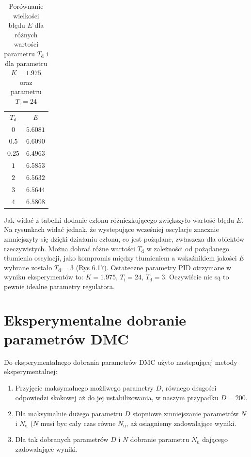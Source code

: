 \begin{table}
	[b] \caption{Porównanie wielkości błędu $E$ dla różnych wartości parametru $T_{\mathrm{d}}$ i dla parametru $K=1.975$ oraz parametru $T_{\mathrm{i}}=24$}
	\label{t_T_i}
	\centering
	\begin{small}
		\begin{tabular}{|c|c|}
			\hline
			$T_{\mathrm{d}}$	&	$E$	\\
			$0$		&	$\num{5.6081}$		\\
			$\num{0.5}$ 	&	$\num{6.6090}$		\\
			$\num{0.25}	$ & $\num{6.4963}$ \\
			$1$ 	&	$\num{6.5853}$		\\
			$2$		&	$\num{6.5632}$	\\
			$3$		&	$\num{6.5644}$	\\
			$4$		&	$\num{6.5808}$	\\
			\hline
			\end{tabular}
	\end{small}
\end{table}

Jak widać z tabelki dodanie członu różniczkującego zwiększyło wartość błędu $E$. Na rysunkach widać jednak, że wystepujące wcześniej oscylacje znacznie zmniejszyły się dzięki działaniu członu, co jest pożądane, zwłaszcza dla obiektów rzeczywistych. Można dobrać różne wartości $T_{\mathrm{d}}$ w zależności od pożądanego tłumienia oscylacji, jako kompromis między tłumieniem a wskaźnikiem jakości $E$ wybrane zostało $T_{\mathrm{d}}=3$ (Rys 6.17). Ostateczne parametry PID otrzymane w wyniku eksperymentów to: $K=\num{1.975}$, $T_{\mathrm{i}}=24$, $T_{\mathrm{d}}=3$. Oczywiście nie są to pewnie idealne parametry regulatora.


\section{Eksperymentalne dobranie parametrów DMC}

Do eksperymentalnego dobrania parametrów DMC użyto nastepującej metody eksperymentalnej:
\begin{enumerate}
\item Przyjęcie maksymalnego możliwego parametry $D$, równego długości odpowiedzi skokowej aż do jej ustabilizowania, w naszym przypadku $D=200$. 
\item Dla maksymalnie dużego parametru $D$ stopniowe zmniejszanie parametrów $N$ i $N_{\mathrm{u}}$ ($N$ musi byc cały czas równe $N_{\mathrm{u}}$, aż osiągniemy zadowalające wyniki.
\item Dla tak dobranych parametrów $D$ i $N$ dobranie parametru $N_{\mathrm{u}}$ dającego zadowalające wyniki.
\end{enumerate}


